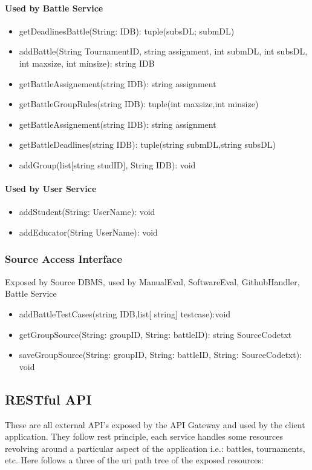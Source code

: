 \paragraph{Used by Battle Service}
\begin{itemize}
    \item getDeadlinesBattle(String: IDB): tuple(subsDL; submDL)
    \item addBattle(String TournamentID, string assignment,  int submDL, int subsDL, int maxsize, int minsize): string IDB
    \item getBattleAssignement(string IDB):  string assignment
    \item getBattleGroupRules(string IDB):  tuple(int  maxsize,int  minsize)
    \item getBattleAssignement(string IDB):  string assignment
    \item getBattleDeadlines(string IDB):  tuple(string submDL,string  subsDL)
    \item addGroup(list[string studID], String IDB): void
\end{itemize}
\paragraph{Used by User Service}
\begin{itemize}
    \item addStudent(String: UserName): void
    \item addEducator(String UserName): void
\end{itemize}
\subsubsection{Source Access Interface}
Exposed by Source DBMS, used by ManualEval, SoftwareEval, GithubHandler, Battle Service

\begin{itemize}
    \item addBattleTestCases(string IDB,list[ string] testcase):void
    \item getGroupSource(String: groupID, String: battleID): string SourceCodetxt
    \item saveGroupSource(String: groupID, String: battleID, String: SourceCodetxt): void
\end{itemize}
\subsection{RESTful API}
These are all external API's exposed by the API Gateway and used by the client application. They follow rest principle, each service handles some resources revolving around a particular aspect of the application i.e.: battles, tournaments, etc.  
Here follows a three of the uri path tree of the exposed resources:  
 
